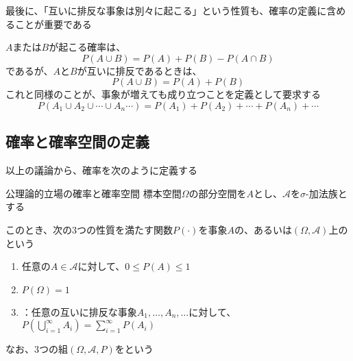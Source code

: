 \documentclass[../../../topic_probability-statistics]{subfiles}
\begin{document}
\br

最後に、「互いに排反な事象は別々に起こる」という性質も、確率の定義に含めることが重要である

\br

$A$または$B$が起こる確率は、
\begin{equation*}
  P(A \cup B) = P(A) + P(B) - P(A \cap B)
\end{equation*}
であるが、$A$と$B$が互いに排反であるときは、
\begin{equation*}
  P(A \cup B) = P(A) + P(B)
\end{equation*}
これと同様のことが、事象が増えても成り立つことを定義として要求する
\begin{equation*}
  P(A_1 \cup A_2 \cup \cdots \cup A_n \cdots) = P(A_1) + P(A_2) + \cdots + P(A_n) + \cdots
\end{equation*}

\subsection{確率と確率空間の定義}

以上の議論から、確率を次のように定義する

\begin{definition}{公理論的立場の確率と確率空間}
  標本空間$\Omega$の部分空間を$A$とし、$\mathscr{A}$を$\sigma$-加法族とする

  このとき、次の3つの性質を満たす関数$P(\cdot)$を事象$A$の、あるいは$(\Omega, \mathscr{A})$上のという
  \begin{enumerate}[label=\romanlabel]
    \item 任意の$A \in \mathscr{A}$に対して、$0 \leq P(A) \leq 1$
    \item $P(\Omega) = 1$
    \item {}：任意の互いに排反な事象$A_1, \ldots, A_n, \ldots$に対して、$\displaystyle P\left(\bigcup_{i=1}^\infty A_i\right) = \sum_{i=1}^\infty P(A_i)$
  \end{enumerate}

  なお、3つの組$(\Omega, \mathscr{A}, P)$をという
\end{definition}
\end{document}
